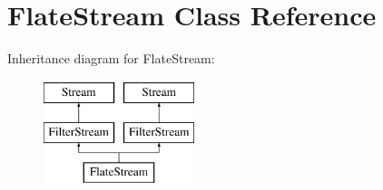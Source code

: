 \hypertarget{class_flate_stream}{}\section{Flate\+Stream Class Reference}
\label{class_flate_stream}
Inheritance diagram for Flate\+Stream\+:\begin{figure}[H]
\begin{center}
\leavevmode
\includegraphics[height=3.000000cm]{class_flate_stream}
\end{center}
\end{figure}
